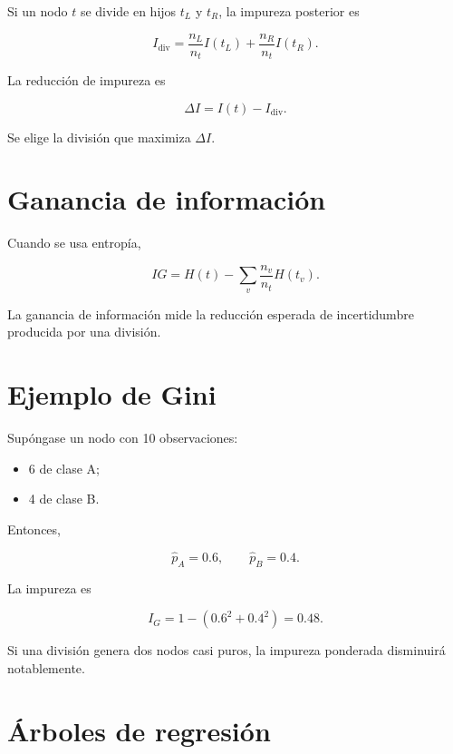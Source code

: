 \documentclass[
  spanish,
  10.5pt,
  letterpaper,
  DIV=11,
  numbers=noendperiod,
  oneside,
  open=any]{scrreprt}
\providecommand{\tightlist}{%
  \setlength{\itemsep}{0pt}\setlength{\parskip}{0pt}}
\theoremstyle{definition}
\theoremstyle{definition}
\theoremstyle{plain}
\theoremstyle{remark}
\begin{document}
Si un nodo \(t\) se divide en hijos \(t_L\) y \(t_R\), la impureza
posterior es

\[
I_{\text{div}}
=
\frac{n_L}{n_t}I(t_L)
+
\frac{n_R}{n_t}I(t_R).
\]

La reducción de impureza es

\[
\Delta I
=
I(t)-I_{\text{div}}.
\]

Se elige la división que maximiza \(\Delta I\).

\section*{Ganancia de información}\label{ganancia-de-informaciuxf3n}


Cuando se usa entropía,

\[
IG
=
H(t)
-
\sum_{v}
\frac{n_v}{n_t}H(t_v).
\]

La ganancia de información mide la reducción esperada de incertidumbre
producida por una división.

\section*{Ejemplo de Gini}\label{ejemplo-de-gini}


Supóngase un nodo con 10 observaciones:

\begin{itemize}
\tightlist
\item
  6 de clase A;
\item
  4 de clase B.
\end{itemize}

Entonces,

\[
\widehat{p}_A=0.6,
\qquad
\widehat{p}_B=0.4.
\]

La impureza es

\[
I_G
=
1-(0.6^2+0.4^2)
=
0.48.
\]

Si una división genera dos nodos casi puros, la impureza ponderada
disminuirá notablemente.

\section*{Árboles de regresión}\label{uxe1rboles-de-regresiuxf3n}
\end{document}
